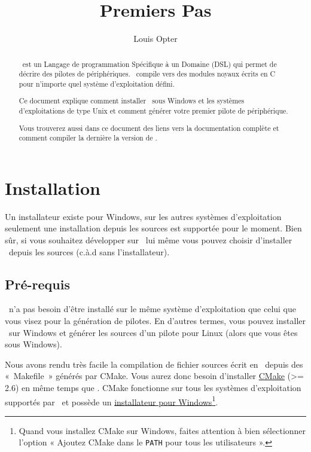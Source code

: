 \documentclass[francais]{rtxarticle}
\title{Premiers Pas}
\author{Louis Opter}
\begin{document}
\maketitle

\begin{abstract}
\rtx\ est un Langage de programmation Spécifique à un Domaine (DSL) qui permet
de décrire des pilotes de périphériques. \rtx\ compile vers des modules noyaux
écrits en C pour n'importe quel système d'exploitation défini.

Ce document explique comment installer \rtx\ sous Windows et les systèmes
d'exploitations de type Unix et comment générer votre premier pilote de
périphérique.

Vous trouverez aussi dans ce document des liens vers la documentation complète
et comment compiler la dernière la version de \rtx.
\end{abstract}

\tableofcontents

\pagebreak

\section{Installation}

Un installateur existe pour Windows, sur les autres systèmes d'exploitation
seulement une installation depuis les sources est supportée pour le moment.
Bien sûr, si vous souhaitez développer sur \rtx\ lui même vous pouvez choisir
d'installer \rtx\ depuis les sources (c.à.d sans l'installateur).

\subsection{Pré-requis}

\rtx\ n'a pas besoin d'être installé sur le même système d'exploitation que
celui que vous visez pour la génération de pilotes. En d'autres termes, vous
pouvez installer \rtx\ sur Windows et générer les sources d'un pilote pour Linux
(alors que vous êtes sous Windows).

Nous avons rendu très facile la compilation de fichier sources écrit en \rtx\
depuis des «~Makefile~» générés par CMake. Vous aurez donc besoin d'installer
\href{http://www.cmake.org/}{CMake} (>= 2.6) en même temps que \rtx. CMake
fonctionne sur tous les systèmes d'exploitation supportés par \rtx\ et possède
un \href{http://www.cmake.org/cmake/resources/software.html}{installateur pour
Windows}\footnote{Quand vous installez CMake sur Windows, faites attention à
bien sélectionner l'option « Ajoutez CMake dans le \texttt{PATH} pour tous les
utilisateurs ».}.
\end{document}
